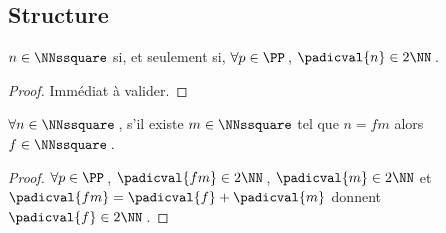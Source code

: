\subsection{Structure}




\leavevmode
\smallskip

\begin{fact} \label{prime-square}
	$n \in \NNssquare$ si, et seulement si,
	$\forall p \in \PP$\,,
	$\padicval{n} \in 2 \NN$\,.
\end{fact}


\begin{proof}
	Immédiat à valider.
\end{proof}




\begin{fact} \label{facto-square}
	$\forall n \in \NNssquare$\,, s'il existe $m \in \NNssquare$ tel que $n =  f m$ alors $f  \in \NNssquare$\,.
\end{fact}


\begin{proof}
	$\forall p \in \PP$\,, 
	$\padicval{f m} \in 2 \NN$\,,
	$\padicval{m} \in 2 \NN$
	et
	$\padicval{f m} = \padicval{f} + \padicval{m}$
	donnent
	$\padicval{f} \in 2 \NN$\,.
\end{proof}


%
%
%
%


%
%
%



